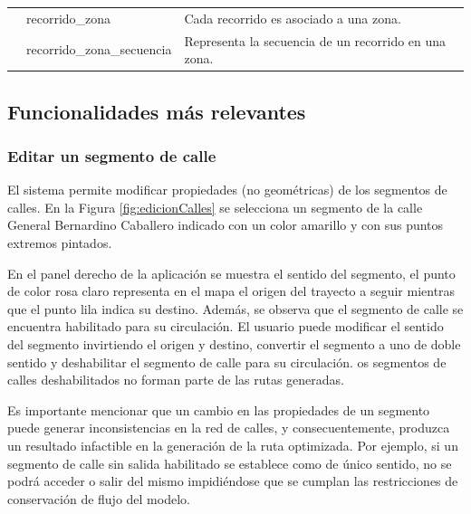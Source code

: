 \begin{table}[]
{\begin{tabular}{lll}
                                                                                                 & recorrido\_zona            & Cada recorrido es asociado a una zona.                                                                                                                             \\
                                                                                                 & recorrido\_zona\_secuencia & Representa la secuencia de un recorrido en una zona.                                                                                                               \\ \hline
\end{tabular}%
}
\end{table}

\subsection{Funcionalidades más relevantes}

\subsubsection{Editar un segmento de calle}

El sistema permite modificar propiedades (no geométricas) de los segmentos de calles. En la Figura \ref{fig:edicionCalles} se selecciona un segmento de la calle General Bernardino Caballero indicado con un color amarillo y con sus puntos extremos pintados.

En el panel derecho de la aplicación se muestra el sentido del segmento, el punto de color rosa claro representa en el mapa el origen del trayecto a seguir mientras que el punto lila indica su destino. Además, se observa que el segmento de calle se encuentra habilitado para su circulación. El usuario puede modificar el sentido del segmento invirtiendo el origen y destino, convertir el segmento a uno de doble sentido y deshabilitar el segmento de calle para su circulación. os segmentos de calles deshabilitados no forman parte de las rutas generadas.
 
Es importante mencionar que un cambio en las propiedades de un segmento puede generar inconsistencias en la red de calles, y consecuentemente, produzca un resultado infactible en la generación de la ruta optimizada. Por ejemplo, si un segmento de calle sin salida habilitado se establece como de único sentido, no se podrá acceder o salir del mismo impidiéndose que se cumplan las restricciones de conservación de flujo del modelo.

